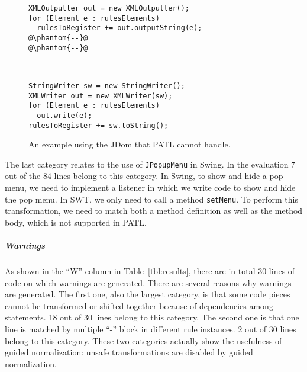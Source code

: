 \documentclass[letterpaper, USenglish]{lipics-v2016}
\newenvironment{smpage}[1]
{\begin{lrbox}{\fmbox}\begin{minipage}{#1}}
{\end{minipage}\end{lrbox}\usebox{\fmbox}}
\newcommand{\code}[1]{\texttt{\footnotesize #1}}
\newcommand{\PATL}{PATL\xspace}
\theoremstyle{plain}
\begin{document}
\begin{figure}[ht]
\vspace{-7pt}
\begin{center}
\begin{smpage}{0.48\columnwidth}
\begin{lstlisting}[style=java,frame=none,numbers=none,basicstyle=\ttfamily\scriptsize]
XMLOutputter out = new XMLOutputter();
for (Element e : rulesElements) 
  rulesToRegister += out.outputString(e);
@\phantom{--}@
@\phantom{--}@
\end{lstlisting}
\end{smpage}
~~
\begin{smpage}{0.44\columnwidth}
\begin{lstlisting}[style=java,frame=none,numbers=none,basicstyle=\ttfamily\scriptsize]
StringWriter sw = new StringWriter();
XMLWriter out = new XMLWriter(sw);
for (Element e : rulesElements) 
  out.write(e);
rulesToRegister += sw.toString();
\end{lstlisting}
\end{smpage}
\end{center}
\vspace{-18pt}
\caption{An example using the JDom that \PATL cannot handle.}
\vspace{-12pt}
\label{fg:untransformable}
\end{figure}

The last category relates to the use of \code{JPopupMenu} in Swing.
In the evaluation 7 out of the 84 lines belong to this category. In
Swing, to show and hide a pop menu, we need to implement a listener in
which we write code to show and hide the pop menu. In SWT, we only
need to call a method \code{setMenu}. To perform this transformation,
we need to match both a method definition as well as the method body,
which is not supported in \PATL.


\subparagraph*{Warnings}
As shown in the ``W'' column in Table~\ref{tbl:results}, there are in
total 30 lines of code on which warnings are generated. There are
several reasons why warnings are generated. The first one, also the
largest category, is that some code pieces
cannot be transformed or shifted together because of dependencies
among statements. 18 out of 30 lines belong to this category. The
second one is that one line is matched by multiple ``-'' block in
different rule instances. 2 out of 30 lines belong to this category.
These two categories
actually show the usefulness of guided normalization: unsafe
transformations are disabled by guided normalization. 
\end{document}

